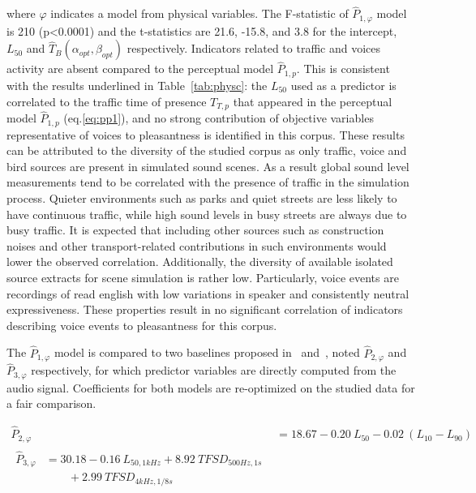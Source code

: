 \documentclass[twocolumn]{article}
\begin{document}
where $\varphi$ indicates a model from physical variables. The F-statistic of $\hat P_{1, \varphi}$ model is 210 (p<0.0001) and the t-statistics are 21.6, -15.8, and 3.8 for the intercept, $L_{50}$ and $\hat T_B(\alpha_{opt}, \beta_{opt})$ respectively. Indicators related to traffic and voices activity are absent compared to the perceptual model $\hat P_{1, p}$. This is consistent with the results underlined in Table~\ref{tab:physc}: the $L_{50}$ used as a predictor is correlated to the traffic time of presence $T_{T, p}$ that appeared in the perceptual model $\hat P_{1, p}$ (eq.\ref{eq:pp1}), and no strong contribution of objective variables representative of voices to pleasantness is identified in this corpus. These results can be attributed to the diversity of the studied corpus as only traffic, voice and bird sources are present in simulated sound scenes. As a result global sound level measurements tend to be correlated with the presence of traffic in the simulation process. Quieter environments such as parks and quiet streets are less likely to have continuous traffic, while high sound levels in busy streets are always due to busy traffic. It is expected that including other sources such as construction noises and other transport-related contributions in such environments would lower the observed correlation. Additionally, the diversity of available isolated source extracts for scene simulation is rather low. Particularly, voice events are recordings of read english with low variations in speaker and consistently neutral expressiveness. These properties result in no significant correlation of indicators describing voice events to pleasantness for this corpus.

The $\hat P_{1, \varphi}$ model is compared to two baselines proposed in~\cite{ricciardi2014} and~\cite{aumond2017}, noted $\hat P_{2, \varphi}$ and $\hat P_{3, \varphi}$ respectively, for which predictor variables are directly computed from the audio signal. Coefficients for both models are re-optimized on the studied data for a fair comparison.

\begin{align}
\hat P_{2, \varphi} &= 18.67 - 0.20~L_{50} - 0.02~(L_{10}-L_{90})\\
\begin{split}
\hat P_{3, \varphi} &= 30.18 - 0.16~L_{50, 1kHz} + 8.92~TFSD_{500Hz, 1s} \\
&\qquad + 2.99~TFSD_{4kHz, 1/8s}
\end{split}
\end{align}
\end{document}
